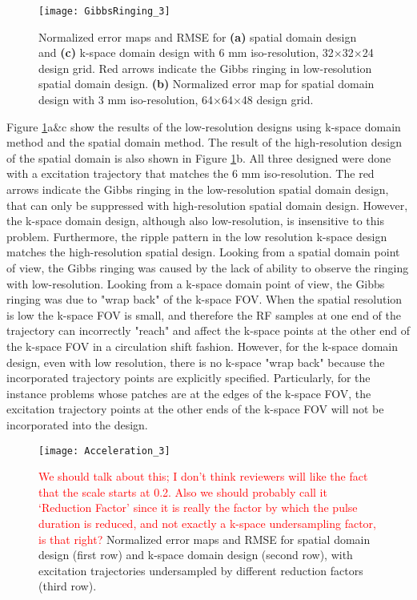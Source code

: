 \begin{figure}
	\centering
	\texttt{[image: GibbsRinging\_3]}
	\caption{Normalized error maps and RMSE for \textbf{(a)} spatial domain design and \textbf{(c)} k-space domain design with 6 mm iso-resolution, 32$\times$32$\times$24 design grid. Red arrows indicate the Gibbs ringing in low-resolution spatial domain design. \textbf{(b)} Normalized error map for spatial domain design with 3 mm iso-resolution, 64$\times$64$\times$48 design grid.}
	\label{fig:GibbsRing}
\end{figure}

Figure \ref{fig:GibbsRing}a\&c show the results of the  low-resolution designs using k-space domain method and the spatial domain method. The result of the high-resolution design of the spatial domain is also shown in Figure \ref{fig:GibbsRing}b. All three designed were done with a excitation trajectory that matches the 6 mm iso-resolution. The red arrows indicate the Gibbs ringing in the low-resolution spatial domain design, that can only be suppressed with high-resolution spatial domain design. However, the k-space domain design, although also low-resolution, is insensitive to this problem. Furthermore, the ripple pattern in the low resolution k-space design matches the high-resolution spatial design. Looking from a spatial domain point of view, the Gibbs ringing was caused by the lack of ability to observe the ringing with low-resolution. Looking from a k-space domain point of view, the Gibbs ringing was due to "wrap back" of the k-space FOV. When the spatial resolution is low the k-space FOV is small, and therefore the RF samples at one end of the trajectory can incorrectly "reach" and affect the k-space points at the other end of the k-space FOV in a circulation shift fashion. However, for the k-space domain design, even with low resolution, there is no k-space "wrap back" because the incorporated trajectory points are explicitly specified. Particularly, for the instance problems whose patches are at the edges of the k-space FOV, the excitation trajectory points at the other ends of the k-space FOV will not be incorporated into the design.    


\begin{figure}
	\centering
	\texttt{[image: Acceleration\_3]}
	\caption{ \textcolor{red}{We should talk about this; I don't think reviewers will like the fact that the scale starts at 0.2. Also we should probably call it `Reduction Factor' since it is 
	really the factor by which the pulse duration is reduced, and not exactly a k-space undersampling factor, is that right?}
	Normalized error maps and RMSE for spatial domain design (first row) and k-space domain design (second row), with excitation trajectories undersampled by different reduction factors (third row).}
	\label{fig:kspace_PTX_Acceleration}
\end{figure}

